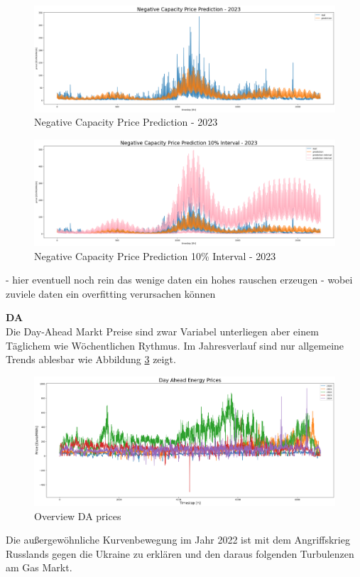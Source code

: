 \begin{figure}[!h]
	\includegraphics[width=1\linewidth]{pictures/RL/Negative Capacity Price Prediction - 2023.png}
	\caption{Negative Capacity Price Prediction - 2023}
	\label{fig:Negative Capacity Price Prediction - 2023}
\end{figure}

\begin{figure}[H]
	\includegraphics[width=1\linewidth]{pictures/RL/Negative Capacity Price Prediction Interval - 2023.png}
	\caption{Negative Capacity Price Prediction 10\% Interval - 2023}
	\label{fig:Negative Capacity Price Prediction Interval - 2023}
\end{figure}

- hier eventuell noch rein das wenige daten ein hohes rauschen erzeugen
- wobei zuviele daten ein overfitting verursachen können



\textbf{DA}\\
Die Day-Ahead Markt Preise sind zwar Variabel unterliegen aber einem Täglichem wie Wöchentlichen Rythmus.
Im Jahresverlauf sind nur allgemeine Trends ablesbar wie Abbildung \ref{fig:overviewDAprices} zeigt.
\begin{figure}[!h]
	\includegraphics[width=1\linewidth]{pictures/overviewDAprices_year.png}
	\caption{Overview DA prices}
	\label{fig:overviewDAprices}
\end{figure}
Die außergewöhnliche Kurvenbewegung im Jahr 2022 ist mit dem Angriffskrieg Russlands gegen die Ukraine zu erklären
und den daraus folgenden Turbulenzen am Gas Markt.


